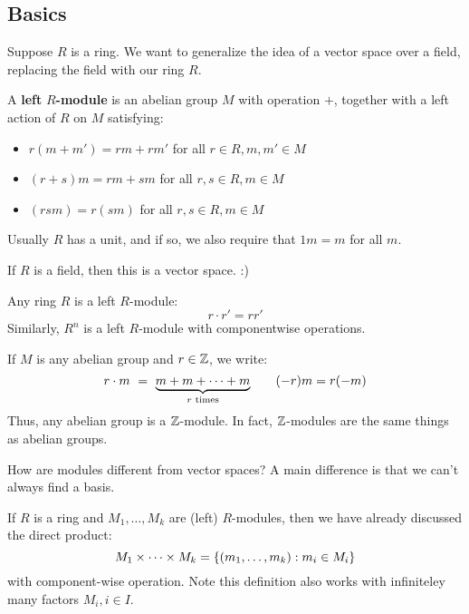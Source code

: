 \subsection{Basics}

Suppose $ R $ is a ring. We want to generalize the idea of a vector space over a field, replacing
the field with our ring $ R $.

\begin{defn}
    A \textbf{left} $ R $\textbf{-module} is an abelian group $ M $ with operation $ + $,
    together with a left action of $ R $ on $ M $ satisfying:
    \begin{itemize}
        \item $ r(m+m') = rm + rm' $ for all $ r \in R, m, m' \in M $
        \item $ (r+s)m = rm + sm $ for all $ r, s \in R, m \in M $
        \item $ (rsm) = r(sm) $ for all $ r, s \in R, m \in M $
    \end{itemize}
    Usually $ R $ has a unit, and if so, we also require that $ 1m = m $ for all $ m $.
\end{defn}

\begin{crll}
    If $ R $ is a field, then this is a vector space. :)
\end{crll}

\begin{xmp}[source=Primary Source Material]
    Any ring $ R $ is a left $ R $-module:
    \begin{equation*}
        r \cdot r' = rr'
    \end{equation*}
    Similarly, $ R^{n} $ is a left $ R $-module with componentwise operations.
\end{xmp}

If $ M $ is any abelian group and $ r \in \mathbb{Z} $, we write:
\begin{equation*}
    r \cdot m \ = \ \underbrace{m + m + \dots + m}_{r \trm{ times}} \qquad
    (-r)m = r(-m)
\end{equation*}
Thus, any abelian group is a $ \mathbb{Z} $-module.
In fact, $ \mathbb{Z} $-modules are the same things as abelian groups.


How are modules different from vector spaces?
A main difference is that we can't always find a basis.

If $ R $ is a ring and $ M_{1}, \dots, M_{k} $ are (left) $ R $-modules, then
we have already discussed the direct product:
\begin{equation*}
    M_{1} \times \cdots \times M_{k} = \left\{{(m_{1}, \dots, m_{k}) : m_{i} \in M_{i}}\right\}
\end{equation*}
with component-wise operation.
Note this definition also works with infiniteley many factors $ M_{i}, i \in I $.


